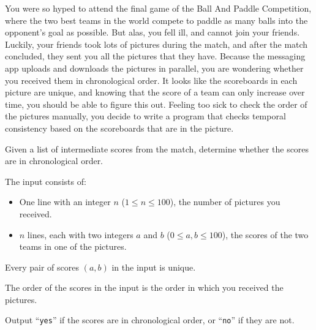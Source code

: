 \problemname{}


\newcommand{\maxn}{100}
\newcommand{\maxab}{100}

You were so hyped to attend the final game of the Ball And Paddle Competition,
where the two best teams in the world compete to paddle as many balls into the opponent's goal as possible.
But alas, you fell ill, and cannot join your friends.
Luckily, your friends took lots of pictures during the match,
and after the match concluded, they sent you all the pictures that they have.
Because the messaging app uploads and downloads the pictures in parallel,
you are wondering whether you received them in chronological order.
It looks like the scoreboards in each picture are unique,
and knowing that the score of a team can only increase over time,
you should be able to figure this out.
Feeling too sick to check the order of the pictures manually,
you decide to write a program that checks temporal consistency based on the scoreboards that are in the picture.

Given a list of intermediate scores from the match,
determine whether the scores are in chronological order.

\begin{Input}
    The input consists of:
    \begin{itemize}
        \item One line with an integer $n$ ($1\leq n\leq \maxn$), the number of pictures you received.
        \item $n$ lines, each with two integers $a$ and $b$ ($0 \leq a,b \leq \maxab$),
            the scores of the two teams in one of the pictures.
    \end{itemize}
    Every pair of scores $(a, b)$ in the input is unique.

    The order of the scores in the input is the order in which you received the pictures.
\end{Input}

\begin{Output}
    Output ``\texttt{yes}'' if the scores are in chronological order, or ``\texttt{no}'' if they are not.
\end{Output}
